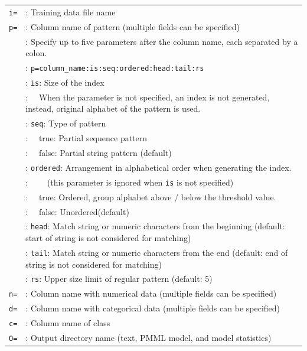 \begin{table}[htbp]
{\small
\begin{tabular}{ll}

\verb|i=|     & : Training data file name \\
\verb|p=|     & : Column name of pattern (multiple fields can be specified)  \\
              & : Specify up to five parameters after the column name, each separated by a colon.  \\
              & : \verb|p=column_name:is:seq:ordered:head:tail:rs| \\
              & : \verb|is|: Size of the index \\
              & : \ \  When the parameter is not specified, an index is not generated, instead, original alphabet of the pattern is used.   \\
              & : \verb|seq|: Type of pattern  \\
              & : \ \ true: Partial sequence pattern \\
              & : \ \ false: Partial string pattern (default) \\
              & : \verb|ordered|: Arrangement in alphabetical order when generating the index. \\
              & : \ \ \ \ (this parameter is ignored when \verb|is| is not specified) \\
              & : \ \ true: Ordered, group alphabet above / below the threshold value. \\
              & : \ \ false: Unordered(default) \\
              & : \verb|head|: Match string or numeric characters from the beginning (default: start of string is not considered for matching)  \\
              & : \verb|tail|: Match string or numeric characters from the end (default: end of string is not considered for matching) \\
              & : \verb|rs|: Upper size limit of regular pattern (default: 5)  \\
\verb|n=|     & : Column name with numerical data (multiple fields can be specified) \\
\verb|d=|     & : Column name with categorical data (multiple fields can be specified) \\
\verb|c=|     & : Column name of class \\
\verb|O=|     & : Output directory name (text, PMML model, and model statistics)  \\

\end{tabular}}
\end{table}

